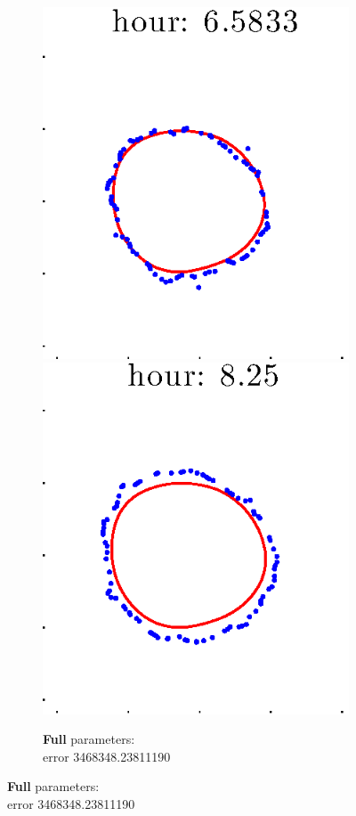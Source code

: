 \documentclass[12pt]{article}
\begin{document}
\begin{figure}[h!]
\begin{subfigure}[b]{.3\textwidth}
		\includegraphics[height=.15\textheight]{Pos5exp2/full/full5.eps}
		\includegraphics[height=.15\textheight]{Pos5exp2/full/full6.eps}
		\caption{\textbf{Full} parameters: \\error 3468348.23811190}

\end{subfigure}
\end{figure}
\end{document}
